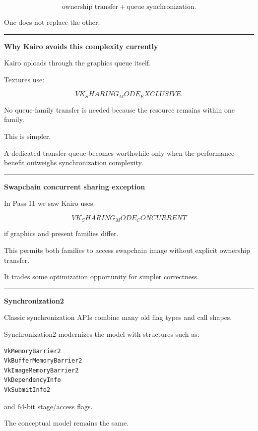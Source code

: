 \[
\boxed{
\text{ownership transfer}
+
\text{queue synchronization}.
}
\]

One does not replace the other.

\begin{center}\rule{0.5\linewidth}{0.5pt}\end{center}

\textbf{Why Kairo avoids this complexity currently}

Kairo uploads through the graphics queue itself.

Textures use:

\[
VK_SHARING_MODE_EXCLUSIVE.
\]

No queue-family transfer is needed because the resource remains within one family.

This is simpler.

A dedicated transfer queue becomes worthwhile only when the performance benefit outweighs synchronization complexity.

\begin{center}\rule{0.5\linewidth}{0.5pt}\end{center}

\textbf{Swapchain concurrent sharing exception}

In Pass 11 we saw Kairo uses:

\[
VK_SHARING_MODE_CONCURRENT
\]

if graphics and present families differ.

This permits both families to access swapchain image without explicit ownership transfer.

It trades some optimization opportunity for simpler correctness.

\begin{center}\rule{0.5\linewidth}{0.5pt}\end{center}

\textbf{Synchronization2}

Classic synchronization APIs combine many old flag types and call shapes.

Synchronization2 modernizes the model with structures such as:

\begin{verbatim}
VkMemoryBarrier2
VkBufferMemoryBarrier2
VkImageMemoryBarrier2
VkDependencyInfo
VkSubmitInfo2
\end{verbatim}

and 64-bit stage/access flags.

The conceptual model remains the same.

